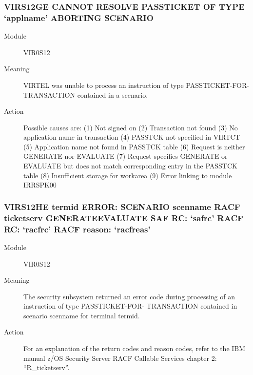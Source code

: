 \documentclass[letterpaper,10pt,english]{sphinxmanual}
\begin{document}
\subsubsection{VIRS12GE CANNOT RESOLVE PASSTICKET OF TYPE ‘applname’ ABORTING SCENARIO}
\label{\detokenize{messages:virs12ge-cannot-resolve-passticket-of-type-applname-aborting-scenario}}\begin{description}
\item[{Module}] \leavevmode
VIR0S12

\item[{Meaning}] \leavevmode
VIRTEL was unable to process an instruction of type PASSTICKET-FOR-TRANSACTION contained in a scenario.

\item[{Action}] \leavevmode
Possible causes are: (1) Not signed on (2) Transaction not found (3) No application name in transaction (4) PASSTCK not specified in VIRTCT (5) Application name not found in PASSTCK table (6) Request is neither GENERATE nor EVALUATE (7) Request specifies GENERATE or EVALUATE but does not match corresponding entry in the PASSTCK table (8) Insufficient storage for workarea (9) Error linking to module IRRSPK00

\end{description}


\subsubsection{VIRS12HE termid ERROR: SCENARIO scenname RACF ticketserv GENERATE\textbar{}EVALUATE SAF RC: ‘safrc’ RACF RC: ‘racfrc’ RACF reason: ‘racfreas’}
\label{\detokenize{messages:virs12he-termid-error-scenario-scenname-racf-ticketserv-generate-evaluate-saf-rc-safrc-racf-rc-racfrc-racf-reason-racfreas}}\begin{description}
\item[{Module}] \leavevmode
VIR0S12

\item[{Meaning}] \leavevmode
The security subsystem returned an error code during processing of an instruction of type PASSTICKET-FOR- TRANSACTION contained in scenario scenname for terminal termid.

\item[{Action}] \leavevmode
For an explanation of the return codes and reason codes, refer to the IBM manual z/OS Security Server RACF Callable Services chapter 2: “R\_ticketserv”.

\end{description}
\end{document}
